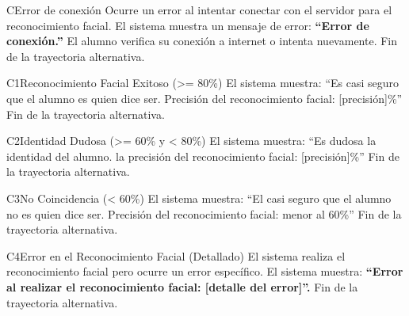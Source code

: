 \begin{UCtrayectoriaA}{C}{Error de conexión}
	\UCpaso Ocurre un error al intentar conectar con el servidor para el reconocimiento facial.
	\UCpaso El sistema muestra un mensaje de error: \textbf{ ``Error de conexión.''}
	\UCpaso[\UCactor] El alumno verifica su conexión a internet o intenta nuevamente.
	\UCpaso Fin de la trayectoria alternativa.
\end{UCtrayectoriaA}
\begin{UCtrayectoriaA}{C1}{Reconocimiento Facial Exitoso (>= 80\%)}
	\UCpaso El sistema muestra: ``Es casi seguro que el alumno es quien dice ser. Precisión del reconocimiento facial: [precisión]\%''
	\UCpaso Fin de la trayectoria alternativa.
\end{UCtrayectoriaA}
\begin{UCtrayectoriaA}{C2}{Identidad Dudosa (>= 60\% y < 80\%)}
	\UCpaso El sistema muestra: ``Es dudosa la identidad del alumno. la precisión del reconocimiento facial: [precisión]\%''
	\UCpaso Fin de la trayectoria alternativa.
\end{UCtrayectoriaA}
\begin{UCtrayectoriaA}{C3}{No Coincidencia (< 60\%)}
	\UCpaso El sistema muestra: ``El casi seguro que el alumno no es quien dice ser. Precisión del reconocimiento facial: menor al 60\%''
	\UCpaso Fin de la trayectoria alternativa.
\end{UCtrayectoriaA}
\begin{UCtrayectoriaA}{C4}{Error en el Reconocimiento Facial (Detallado)}
	\UCpaso El sistema realiza el reconocimiento facial pero ocurre un error específico.
	\UCpaso El sistema muestra: \textbf{ ``Error al realizar el reconocimiento facial: [detalle del error]''.}
	\UCpaso Fin de la trayectoria alternativa.
\end{UCtrayectoriaA}


